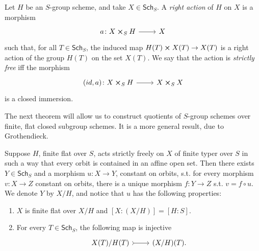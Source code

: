 \documentclass[../Main]{subfiles}
\begin{document}
\begin{defn}
	Let $H$ be an $S$-group scheme, and take $X \in \mathsf{Sch}_{ S }$.
	A {\em right action} of $H$ on $X$ is a morphism
	\begin{equation*}
	\begin{tikzcd}[row sep = 0ex
		,/tikz/column 1/.append style={anchor=base east}
		,/tikz/column 2/.append style={anchor=base west}]
		a\colon X \cross_{ S } H \arrow[r, "", rightarrow] &
		X
	\end{tikzcd}
	\end{equation*} 
	such that, for all $T \in \mathsf{Sch}_{ S }$, the induced map
	$H(T) \cross X(T) \to  X(T)$ is a right action of the
	group $H(T)$ on the set $X(T)$.
	We say that the action is {\em strictly free} iff the morphism
	\begin{equation*}
	\begin{tikzcd}[row sep = 0ex
		,/tikz/column 1/.append style={anchor=base east}
		,/tikz/column 2/.append style={anchor=base west}]
		(id, a)\colon X \cross_{ S } H \arrow[r, "", rightarrow] &
		X \cross_{ S } X
	\end{tikzcd}
	\end{equation*} 
	is a closed immersion.
\end{defn}

The next theorem will allow us to construct quotients of
$S$-group schemes over finite, flat closed subgroup schemes.
It is a more general result, due to Grothendieck.
\begin{thm}
	Suppose $H$, finite flat over $S$, acts strictly freely on $X$
	of finite typer over $S$ in such a way that every orbit is contained in an affine open set.
	Then there exists $Y \in \mathsf{Sch}_{ S }$ and a morphism $u\colon X \to Y$,
	constant on orbits, s.t. for every morphism $v\colon X \to Z$ constant on orbits,
	there is a unique morphism $f\colon Y \to Z$ s.t. $v = f \circ u$.
	We denote $Y$ by $X/H$, and notice that $u$ has the following properties:
\begin{enumerate}
	\item $X$ is finite flat over $X/H$ and $[X:(X/H)] = [H:S]$.
		
	\item For every $T \in \mathsf{Sch}_{ S }$, the following map is injective
		\begin{equation*}
		\begin{tikzcd}
			X(T)/H(T) \arrow[r, "", rightarrowtail] &
			(X/H)(T)
		.\end{tikzcd}
		\end{equation*}
\end{enumerate}
\end{thm}
\end{document}
